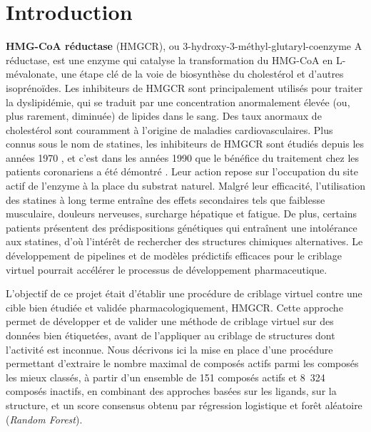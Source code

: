 \documentclass{isddmaster}
\begin{document}
	\section{Introduction}
	\textbf{HMG-CoA réductase} (HMGCR), ou 3-hydroxy-3-méthyl-glutaryl-coenzyme A réductase, est une enzyme qui catalyse la transformation du HMG-CoA en L-mévalonate, une étape clé de la voie de biosynthèse du cholestérol et d'autres isoprénoïdes.
	Les inhibiteurs de HMGCR sont principalement utilisés pour traiter la dyslipidémie, qui se traduit par une concentration anormalement élevée (ou, plus rarement, diminuée) de lipides dans le sang. Des taux anormaux de cholestérol sont couramment à l'origine de maladies cardiovasculaires.
	Plus connus sous le nom de statines, les inhibiteurs de HMGCR sont étudiés depuis les années 1970 \cite{endoML236AML236BML236C1976b,endoCompetitiveInhibition3hydroxy3methylglutaryl1976}, et c'est dans les années 1990 que le bénéfice du traitement chez les patients coronariens a été démontré \cite{RandomisedTrialCholesterol}.
	Leur action repose sur l'occupation du site actif de l'enzyme à la place du substrat naturel. %
	Malgré leur efficacité, l'utilisation des statines à long terme entraîne des effets secondaires tels que faiblesse musculaire, douleurs nerveuses, surcharge hépatique et fatigue. De plus, certains patients présentent des prédispositions génétiques qui entraînent une intolérance aux statines, d'où l'intérêt de rechercher des structures chimiques alternatives.
	Le développement de pipelines et de modèles prédictifs efficaces pour le criblage virtuel pourrait accélérer le processus de développement pharmaceutique.

	L'objectif de ce projet était d'établir une procédure de criblage virtuel contre une cible bien étudiée et validée pharmacologiquement, HMGCR.
	Cette approche permet de développer et de valider une méthode de criblage virtuel sur des données bien étiquetées, avant de l'appliquer au criblage de structures dont l'activité est inconnue.
	Nous décrivons ici la mise en place d'une procédure permettant d'extraire le nombre maximal de composés actifs parmi les composés les mieux classés, à partir d'un ensemble de 151 composés actifs et 8~324 composés inactifs, en combinant des approches basées sur les ligands, sur la structure, et un score consensus obtenu par régression logistique et forêt aléatoire (\textit{Random Forest}).
\end{document}
